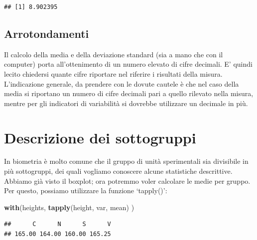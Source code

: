 \documentclass[a4paper,12pt,oneside]{book}
\newenvironment{Shaded}{\begin{snugshade}}{\end{snugshade}}
\newcommand{\KeywordTok}[1]{\textcolor[rgb]{0.13,0.29,0.53}{\textbf{#1}}}
\newcommand{\DecValTok}[1]{\textcolor[rgb]{0.00,0.00,0.81}{#1}}
\newcommand{\StringTok}[1]{\textcolor[rgb]{0.31,0.60,0.02}{#1}}
\newcommand{\OperatorTok}[1]{\textcolor[rgb]{0.81,0.36,0.00}{\textbf{#1}}}
\newcommand{\NormalTok}[1]{#1}
\begin{document}
\begin{Shaded}
\end{Shaded}

\begin{verbatim}
## [1] 8.902395
\end{verbatim}

\subsection{Arrotondamenti}\label{arrotondamenti}

Il calcolo della media e della deviazione standard (sia a mano che con
il computer) porta all'ottenimento di un numero elevato di cifre
decimali. E' quindi lecito chiedersi quante cifre riportare nel riferire
i risultati della misura. L'indicazione generale, da prendere con le
dovute cautele è che nel caso della media si riportano un numero di
cifre decimali pari a quello rilevato nella misura, mentre per gli
indicatori di variabilità si dovrebbe utilizzare un decimale in più.

\section{Descrizione dei sottogruppi}\label{descrizione-dei-sottogruppi}

In biometria è molto comune che il gruppo di unità sperimentali sia
divisibile in più sottogruppi, dei quali vogliamo conoscere alcune
statistiche descrittive. Abbiamo già visto il boxplot; ora potremmo
voler calcolare le medie per gruppo. Per questo, possiamo utilizzare la
funzione `tapply()':

\begin{Shaded}
\begin{Highlighting}[]
\KeywordTok{with}\NormalTok{(heights, }\KeywordTok{tapply}\NormalTok{(height, var, mean) )}
\end{Highlighting}
\end{Shaded}

\begin{verbatim}
##      C      N      S      V 
## 165.00 164.00 160.00 165.25
\end{verbatim}
\end{document}

